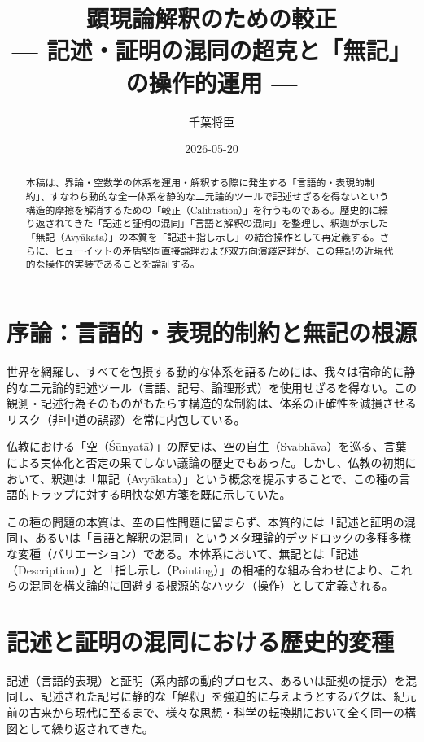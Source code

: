 \documentclass[11pt,a4paper]{ltjsarticle}
\begin{document}
\title{顕現論解釈のための較正\\
--- 記述・証明の混同の超克と「無記」の操作的運用 ---}
\author{千葉将臣}
\date{2026-05-20}
\maketitle

\begin{abstract}
  本稿は、界論・空数学の体系を運用・解釈する際に発生する「言語的・表現的制約」、すなわち動的な全一体系を静的な二元論的ツールで記述せざるを得ないという構造的摩擦を解消するための「較正（Calibration）」を行うものである。歴史的に繰り返されてきた「記述と証明の混同」「言語と解釈の混同」を整理し、釈迦が示した「無記（Avyākata）」の本質を「記述＋指し示し」の結合操作として再定義する。さらに、ヒューイットの矛盾堅固直接論理および双方向演繹定理が、この無記の近現代的な操作的実装であることを論証する。
\end{abstract}

\section{序論：言語的・表現的制約と無記の根源}
世界を網羅し、すべてを包摂する動的な体系を語るためには、我々は宿命的に静的な二元論的記述ツール（言語、記号、論理形式）を使用せざるを得ない。この観測・記述行為そのものがもたらす構造的な制約は、体系の正確性を減損させるリスク（非中道の誤謬）を常に内包している。

仏教における「空（Śūnyatā）」の歴史は、空の自生（Svabhāva）を巡る、言葉による実体化と否定の果てしない議論の歴史でもあった。しかし、仏教の初期において、釈迦は「無記（Avyākata）」という概念を提示することで、この種の言語的トラップに対する明快な処方箋を既に示していた。

この種の問題の本質は、空の自性問題に留まらず、本質的には「記述と証明の混同」、あるいは「言語と解釈の混同」というメタ理論的デッドロックの多種多様な変種（バリエーション）である。本体系において、無記とは「記述（Description）」と「指し示し（Pointing）」の相補的な組み合わせにより、これらの混同を構文論的に回避する根源的なハック（操作）として定義される。

\section{記述と証明の混同における歴史的変種}
記述（言語的表現）と証明（系内部の動的プロセス、あるいは証拠の提示）を混同し、記述された記号に静的な「解釈」を強迫的に与えようとするバグは、紀元前の古来から現代に至るまで、様々な思想・科学の転換期において全く同一の構図として繰り返されてきた。
\end{document}
